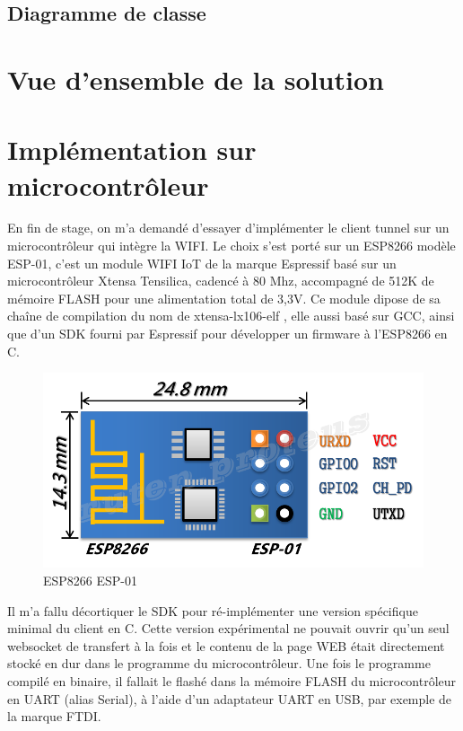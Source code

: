 \subsection{Diagramme de classe}

\section{Vue d'ensemble de la solution}

\section{Implémentation sur microcontrôleur}

En fin de stage, on m'a demandé d'essayer d'implémenter le client tunnel sur un microcontrôleur qui intègre la WIFI. Le choix s'est porté sur un ESP8266 modèle ESP-01, c'est un module WIFI IoT de la marque Espressif basé sur un microcontrôleur Xtensa Tensilica, cadencé à 80 Mhz, accompagné de 512K de mémoire FLASH pour une alimentation total de 3,3V. Ce module dipose de sa chaîne de compilation du nom de \og xtensa-lx106-elf \fg{}, elle aussi basé sur GCC, ainsi que d'un SDK fourni par Espressif pour développer un firmware à l'ESP8266 en C. 

\begin{figure}[htp]
  \centering
  \includegraphics[width=12cm]{images/esp}
  \caption{ESP8266 ESP-01}
  \label{fig:une-autre-image}
\end{figure}

Il m'a fallu décortiquer le SDK pour ré-implémenter une version spécifique minimal du client en C. Cette version expérimental ne pouvait ouvrir qu'un seul websocket de transfert à la fois et le contenu de la page WEB était directement stocké en dur dans le programme du microcontrôleur. Une fois le programme compilé en binaire, il fallait le flashé dans la mémoire FLASH du microcontrôleur en UART (alias Serial), à l'aide d'un adaptateur UART en USB, par exemple de la marque FTDI.

